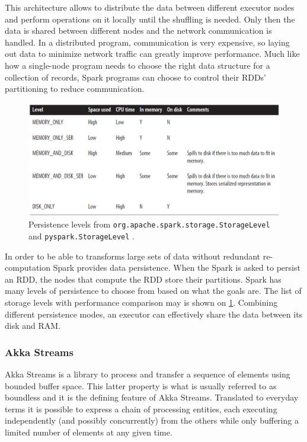 This architecture allows to distribute the data between different executor nodes and perform operations on it locally until the shuffling is needed. Only then the data is shared between different nodes and the network communication is handled. In a distributed program, communication is very expensive, so laying out data to minimize network traffic can greatly improve performance. Much like how a single-node program needs to choose the right data structure for a collection of records, Spark programs can choose to control their RDDs’ partitioning to reduce communication.

\begin{figure}
\centering \includegraphics[width=.9\textwidth]{img/spark_persistence_levels}
\caption{ Persistence levels from \texttt{org.apache.spark.storage.StorageLevel} and
\texttt{pyspark.StorageLevel} \cite{learning_spark}.}\label{img:spark_persistence_levels}
\end{figure}

In order to be able to transforms large sets of data without redundant re-computation Spark provides data persistence. When the Spark is asked to persist an RDD, the nodes that compute the RDD store their partitions. Spark has many levels of persistence to choose from based on what the goals are. The list of storage levels with performance comparison may is shown on \ref{img:spark_persistence_levels}. Combining different persistence modes, an executor can effectively share the data between its disk and RAM.

\subsubsection{Akka Streams}

Akka Streams is a library to process and transfer a sequence of elements using bounded buffer space. This latter property is what is usually referred to as boundless and it is the defining feature of Akka Streams. Translated to everyday terms it is possible to express a chain of processing entities, each executing independently (and possibly concurrently) from the others while only buffering a limited number of elements at any given time. 


